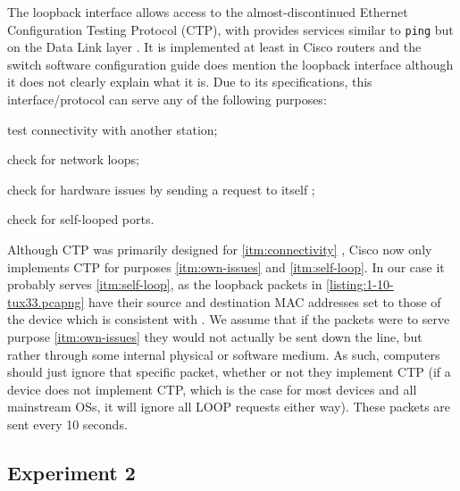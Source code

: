 \documentclass[a4paper, 11pt]{report}
\begin{document}
The loopback interface allows access to the almost-discontinued Ethernet Configuration Testing Protocol (CTP)\cite{how-ethernet-keepalive-works}\cite[\S8]{ethernet}, with provides services similar to \texttt{ping} but on the Data Link layer \cite{jhawk}. It is implemented at least in Cisco routers \cite{jhawk}\cite{whats-a-loop-traffic-in-ethereal} and the switch software configuration guide \cite{cisco-switch-manual} does mention the loopback interface although it does not clearly explain what it is. Due to its specifications, this interface/protocol can serve any of the following purposes:
\begin{enumerate*}[label=(\arabic*)]
    \item \label{itm:connectivity} test connectivity with another station;
    \item \label{itm:loops} check for network loops;
    \item \label{itm:own-issues} check for hardware issues by sending a request to itself \cite{whats-a-loop-traffic-in-ethereal};
    \item \label{itm:self-loop} check for self-looped ports.
\end{enumerate*}
Although CTP was primarily designed for \ref{itm:connectivity} \cite[\S~8.1]{ethernet}, Cisco now only implements CTP for purposes \ref{itm:own-issues} and \ref{itm:self-loop}\cite{whats-a-loop-traffic-in-ethereal}. In our case it probably serves \ref{itm:self-loop}, as the loopback packets in \ref{listing:1-10-tux33.pcapng} have their source and destination MAC addresses set to those of the device which is consistent with \cite{whats-a-loop-traffic-in-ethereal}. We assume that if the packets were to serve purpose \ref{itm:own-issues} they would not actually be sent down the line, but rather through some internal physical or software medium. As such, computers should just ignore that specific packet, whether or not they implement CTP (if a device does not implement CTP, which is the case for most devices and all mainstream OSs, it will ignore all LOOP requests either way). These packets are sent every 10 seconds.

\subsection{Experiment 2} \label{sec:Exp2}
\end{document}

